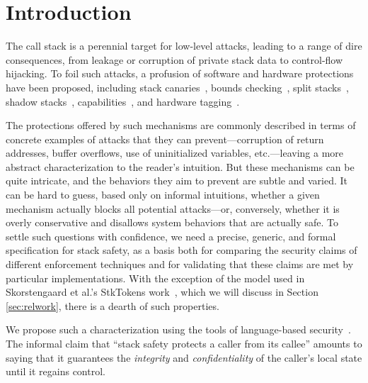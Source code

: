 \documentclass[10pt,conference]{ieeetran}%
\theoremstyle{definition}
\begin{document}
\newcommand{\paragraphx}[1]{\emph{#1.}}

\section{Introduction}

The call stack is a perennial target for low-level attacks, leading to a
range of dire consequences, from leakage or corruption of private stack data
to control-flow hijacking. To foil such attacks, a profusion of
software and hardware protections have been proposed,
%
including stack canaries~\cite{Cowan+98},
bounds checking~\cite{NagarakatteZMZ09,NagarakatteZMZ10,DeviettiBMZ08},
split stacks~\cite{Kuznetsov+14},
shadow stacks~\cite{Dang+15,Shanbhogue+19},
capabilities~\cite{Woodruff+14,Chisnall+15,SkorstengaardLocal,SkorstengaardSTKJFP,Georges+21},
and hardware tagging~\cite{DBLP:conf/sp/RoesslerD18}. 
  \ifaftersubmission{}
\fi

The protections offered by such mechanisms are commonly described in terms
of concrete examples of attacks that they can prevent---corruption of return
addresses, buffer overflows, use of uninitialized variables, etc.---leaving
a more abstract characterization to the reader's intuition.  But these
mechanisms can be quite intricate, and the behaviors they aim to prevent are
subtle and varied. It can be hard to guess, based only on informal
intuitions, whether a given mechanism actually blocks all potential
attacks---or, conversely, whether it is overly conservative and disallows
system behaviors that are actually safe.
To settle such questions with confidence,
we need a precise, generic, and formal specification for stack
safety, as a basis both for comparing the security claims of different
enforcement techniques and for validating that these claims
are met by particular implementations. With the exception of the model used
in Skorstengaard et al.'s StkTokens work~\cite{SkorstengaardSTKJFP}, which we
will discuss in Section \ref{sec:relwork}, there is a dearth of such properties.

We propose such a characterization using the tools of language-based
security~\cite{sabelfeld2003language}. The informal claim that
``stack safety protects a caller
from its callee'' amounts to saying that it guarantees the {\em integrity} and
{\em confidentiality} of the caller’s local state until it regains control.
\end{document}
